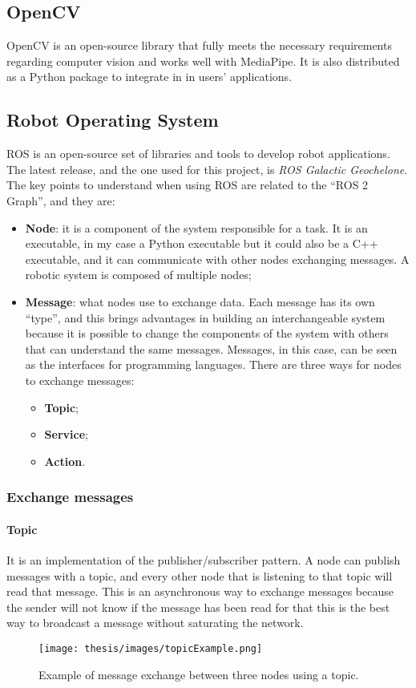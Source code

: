 \documentclass[../thesis.tex]{subfiles}
\begin{document}
\subsection{OpenCV}
OpenCV is an open-source library that fully meets the necessary requirements regarding computer vision and works well with MediaPipe. It is also distributed as a Python package to integrate in in users' applications.

\subsection{Robot Operating System}
\acrfull{ROS} is an open-source set of libraries and tools to develop robot applications. The latest release, and the one used for this project, is \textit{ROS Galactic Geochelone}. The key points to understand when using \acrshort{ROS} are related to the ``ROS 2 Graph'', and they are:
\begin{itemize}
    \item \textbf{Node}: it is a component of the system responsible for a task. It is an executable, in my case a Python executable but it could also be a C++ executable, and it can communicate with other nodes exchanging messages. A robotic system is composed of multiple nodes;
    \item \textbf{Message}: what nodes use to exchange data. Each message has its own ``type'', and this brings advantages in building an interchangeable system because it is possible to change the components of the system with others that can understand the same messages. Messages, in this case, can be seen as the interfaces for programming languages. There are three ways for nodes to exchange messages:
        \begin{itemize}
            \item \textbf{Topic};
            \item \textbf{Service};
            \item \textbf{Action}.
        \end{itemize}
\end{itemize}
\subsubsection{Exchange messages}
\paragraph{Topic}
It is an implementation of the publisher/subscriber pattern. A node can publish messages with a topic, and every other node that is listening to that topic will read that message. This is an asynchronous way to exchange messages because the sender will not know if the message has been read for that this is the best way to broadcast a message without saturating the network.
\begin{figure}[H]
    \centering
    \texttt{[image: thesis/images/topicExample.png]}
    \caption{Example of message exchange between three nodes using a topic.}
    \label{fig:exampleTopicExchangeMessage}
\end{figure}
\end{document}
